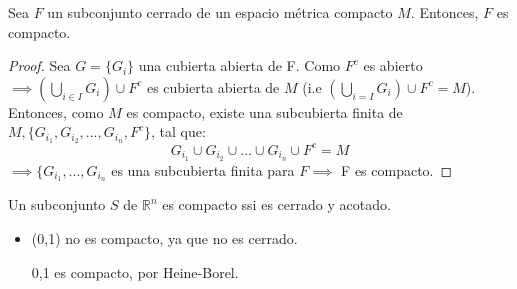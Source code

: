\begin{proposition}
Sea $F$ un subconjunto cerrado de un espacio métrica compacto $M$. Entonces, $F$ es compacto. 
\begin{center}
    


\end{center}
\end{proposition}

\begin{proof}
Sea $G=\{G_i\}$ una cubierta abierta de F. Como $F^c$ es abierto $\implies (\bigcup_{i\in I}G_i)\cup F^c$ es cubierta abierta de $M$ (i.e $(\bigcup_{i=I}G_i)\cup F^c=M$). Entonces, como $M$ es compacto, existe una subcubierta finita de $M, \{G_{i_1},G_{i_2},..., G_{i_n}, F^c\}$, tal que: 
$$G_{i_1}\cup G_{i_2}\cup... \cup G_{i_n}\cup F^c=M$$
$\implies \{ G_{i_1},...,G_{i_n}$ es una subcubierta finita para $F\implies$ F es compacto. 
\end{proof}

\begin{theorem}
Un subconjunto $S$ de $\mathbb{R}^n$ es compacto ssi es cerrado y acotado. 
\end{theorem}

\begin{example}
\begin{itemize}
    \item (0,1) no es compacto, ya que no es cerrado. 
    \item [0,1] es compacto, por Heine-Borel. 
\end{itemize}
\end{example}

